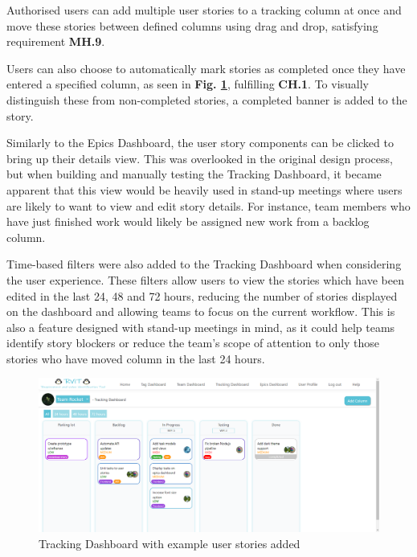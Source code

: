 \documentclass[l4proj.tex]{subfiles}
\begin{document}
Authorised users can add multiple user stories to a tracking column at once and move these stories between defined columns using drag and drop, satisfying requirement \textbf{MH.9}.

Users can also choose to automatically mark stories as completed once they have entered a specified column, as seen in \textbf{Fig. \ref{fig:tracking dashboard}}, fulfilling \textbf{CH.1}. To visually distinguish these from non-completed stories, a completed banner is added to the story.

Similarly to the Epics Dashboard, the user story components can be clicked to bring up their details view. This was overlooked in the original design process, but when building and manually testing the Tracking Dashboard, it became apparent that this view would be heavily used in stand-up meetings where users are likely to want to view and edit story details. For instance, team members who have just finished work would likely be assigned new work from a backlog column. 

Time-based filters were also added to the Tracking Dashboard when considering the user experience. These filters allow users to view the stories which have been edited in the last 24, 48 and 72 hours, reducing the number of stories displayed on the dashboard and allowing teams to focus on the current workflow. This is also a feature designed with stand-up meetings in mind, as it could help teams identify story blockers or reduce the team's scope of attention to only those stories who have moved column in the last 24 hours.

\begin{figure}[h!]
\begin{center}
\includegraphics[scale=0.35]{dissertation/images/TrackingDashboard.png}
\caption{Tracking Dashboard with example user stories added}
\label{fig:tracking dashboard} 
\end{center}
\end{figure}
\end{document}
